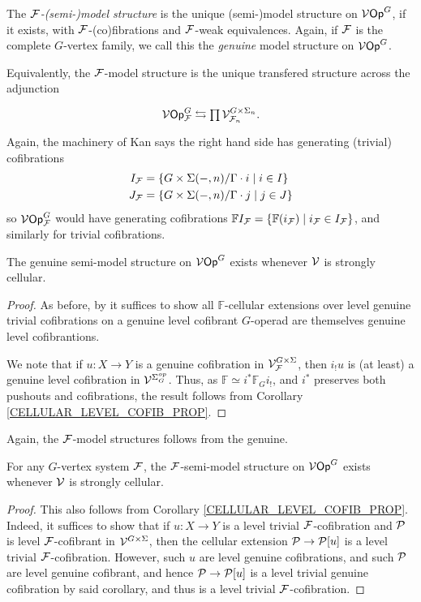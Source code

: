 \documentclass[a4paper,10pt]{article}%
\begin{document}
\begin{definition}
  The \textit{$\F$-(semi-)model structure} is the unique (semi-)model structure on $\V\Op^G$, if it exists, with $\F$-(co)fibrations and $\F$-weak equivalences. Again, if $\F$ is the complete $G$-vertex family, we call this the \textit{genuine} model structure on $\V\Op^G$.
\end{definition}
Equivalently, the $\F$-model structure is the unique transfered structure across the adjunction
\[
\begin{tikzcd}
  \V\Op^G_\F \leftrightarrows \prod \V^{G \times \Sigma_n}_{\F_n}.
\end{tikzcd}
\]
Again, the machinery of Kan says the right hand side has generating (trivial) cofibrations
\begin{align*}
  I_\F &= \sets{G \times \Sigma(-,n)/\Gamma \cdot i}{i \in I}\\
  J_\F &= \sets{G \times \Sigma(-,n)/\Gamma \cdot j}{j \in J}
\end{align*}
so $\V\Op^G_\F$ would have generating cofibrations $\mathbb F I_\F = \sets{\mathbb F (i_\F)}{i_\F\in I_\F}$, and similarly for trivial cofibrations.



\begin{theorem}
  The genuine semi-model structure on $\V\Op^G$ exists whenever $\V$ is strongly cellular.
\end{theorem}
\begin{proof}
  As before, by \cite[Lemma 2.3]{SS00} it suffices to show all $\mathbb F$-cellular extensions over level genuine trivial cofibrations on a genuine level cofibrant $G$-operad are themselves genuine level cofibrantions.

  We note that if $u: X \to Y$ is a genuine cofibration in $\V^{G\times \Sigma}_\F$, then $i_! u$ is (at least) a genuine level cofibration in $\V^{\Sigma_G^{op}}$.
  Thus, as $\mathbb F \simeq i^*\mathbb F_G i_!$, and $i^*$ preserves both pushouts and cofibrations, the result follows from Corollary \ref{CELLULAR_LEVEL_COFIB_PROP}.
\end{proof}


Again, the $\F$-model structures follows from the genuine.
\begin{corollary} 
  For any $G$-vertex system $\F$, the $\F$-semi-model structure on $\V\Op^G$ exists whenever $\V$ is strongly cellular.
\end{corollary} 
\begin{proof} 
  This also follows from Corollary \ref{CELLULAR_LEVEL_COFIB_PROP}. Indeed, it suffices to show that if $u: X\to Y$ is a level trivial $\F$-cofibration and $\P$ is level $\F$-cofibrant in $\V^{G \times \Sigma}$, then the cellular extension $\P \to \P[u]$ is a level trivial $\F$-cofibration. However, such $u$ are level genuine cofibrations, and such $\P$ are level genuine cofibrant, and hence $\P \to \P[u]$ is a level trivial genuine cofibration by said corollary, and thus is a level trivial $\F$-cofibration. 
\end{proof} 
\end{document}
